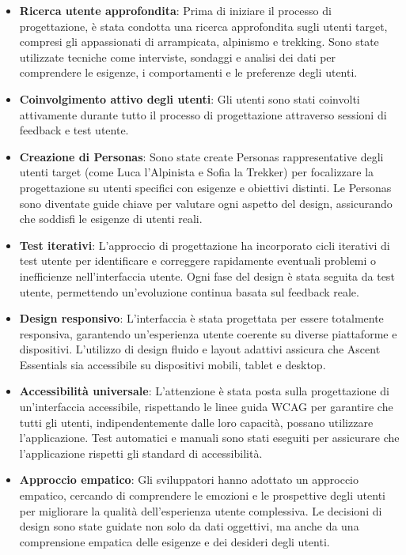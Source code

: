 \begin{itemize}
    \item \textbf{Ricerca utente approfondita}: Prima di iniziare il processo di progettazione, è stata condotta una ricerca approfondita sugli utenti target, compresi gli appassionati di arrampicata, alpinismo e trekking. Sono state utilizzate tecniche come interviste, sondaggi e analisi dei dati per comprendere le esigenze, i comportamenti e le preferenze degli utenti.
    \item \textbf{Coinvolgimento attivo degli utenti}: Gli utenti sono stati coinvolti attivamente durante tutto il processo di progettazione attraverso sessioni di feedback e test utente.
    \item \textbf{Creazione di Personas}: Sono state create Personas rappresentative degli utenti target (come Luca l'Alpinista e Sofia la Trekker) per focalizzare la progettazione su utenti specifici con esigenze e obiettivi distinti. Le Personas sono diventate guide chiave per valutare ogni aspetto del design, assicurando che soddisfi le esigenze di utenti reali.
    \item \textbf{Test iterativi}: L'approccio di progettazione ha incorporato cicli iterativi di test utente per identificare e correggere rapidamente eventuali problemi o inefficienze nell'interfaccia utente. Ogni fase del design è stata seguita da test utente, permettendo un'evoluzione continua basata sul feedback reale.
    \item \textbf{Design responsivo}: L'interfaccia è stata progettata per essere totalmente responsiva, garantendo un'esperienza utente coerente su diverse piattaforme e dispositivi. L'utilizzo di design fluido e layout adattivi assicura che Ascent Essentials sia accessibile su dispositivi mobili, tablet e desktop.
    \item \textbf{Accessibilità universale}: L'attenzione è stata posta sulla progettazione di un'interfaccia accessibile, rispettando le linee guida WCAG per garantire che tutti gli utenti, indipendentemente dalle loro capacità, possano utilizzare l'applicazione. Test automatici e manuali sono stati eseguiti per assicurare che l'applicazione rispetti gli standard di accessibilità.
    \item \textbf{Approccio empatico}: Gli sviluppatori hanno adottato un approccio empatico, cercando di comprendere le emozioni e le prospettive degli utenti per migliorare la qualità dell'esperienza utente complessiva. Le decisioni di design sono state guidate non solo da dati oggettivi, ma anche da una comprensione empatica delle esigenze e dei desideri degli utenti.
\end{itemize}

